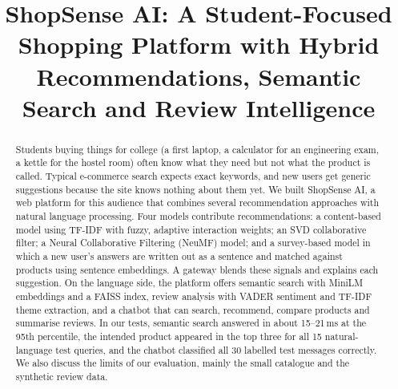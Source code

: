 \documentclass[conference]{IEEEtran}
\begin{document}
\title{ShopSense AI: A Student-Focused Shopping Platform with Hybrid Recommendations, Semantic Search and Review Intelligence}

\author{
\and
{}
\and
{}
\and
{}
}

\maketitle

\begin{abstract}
Students buying things for college (a first laptop, a calculator for an engineering exam, a kettle for the hostel room) often know what they need but not what the product is called. Typical e-commerce search expects exact keywords, and new users get generic suggestions because the site knows nothing about them yet. We built ShopSense AI, a web platform for this audience that combines several recommendation approaches with natural language processing. Four models contribute recommendations: a content-based model using TF-IDF with fuzzy, adaptive interaction weights; an SVD collaborative filter; a Neural Collaborative Filtering (NeuMF) model; and a survey-based model in which a new user's answers are written out as a sentence and matched against products using sentence embeddings. A gateway blends these signals and explains each suggestion. On the language side, the platform offers semantic search with MiniLM embeddings and a FAISS index, review analysis with VADER sentiment and TF-IDF theme extraction, and a chatbot that can search, recommend, compare products and summarise reviews. In our tests, semantic search answered in about 15--21\,ms at the 95th percentile, the intended product appeared in the top three for all 15 natural-language test queries, and the chatbot classified all 30 labelled test messages correctly. We also discuss the limits of our evaluation, mainly the small catalogue and the synthetic review data.
\end{abstract}
\end{document}
